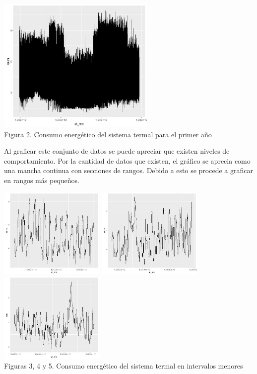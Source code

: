 \documentclass[../Main.tex]{subfiles}
\begin{document}
\begin{center}
\includegraphics[width=3in]{Assets/power1SumAll.png}
\\Figura 2. Consumo energético del sistema termal para el primer año
\end{center}

Al graficar este conjunto de datos se puede apreciar que existen niveles de comportamiento. Por la cantidad de datos que existen, el gráfico se aprecia como una mancha continua con secciones de rangos. Debido a esto se procede a graficar en rangos más pequeños.

\begin{center}
\includegraphics[width=2in]{Assets/power1Sum1k.png}
\includegraphics[width=2in]{Assets/power1Sum5hk1k.png}
\includegraphics[width=2in]{Assets/power1Sum9hk1k.png}
\\Figuras 3, 4 y 5. Consumo energético del sistema termal en intervalos menores
\end{center}
\end{document}
